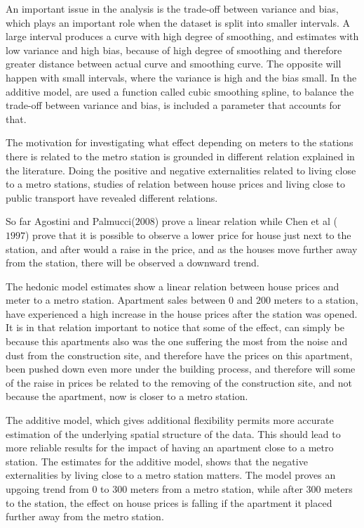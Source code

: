 An important issue in the analysis is the trade-off between variance and 
bias, which plays an important role when the dataset is split into smaller 
intervals. A large interval produces a curve with high degree of smoothing, and 
estimates with low variance and high bias, because of high degree of 
smoothing and therefore greater distance between actual curve and smoothing 
curve.  The opposite will happen with small intervals, where the variance is 
high and the bias small.  In the additive model, are used a function called 
cubic smoothing spline, to balance the trade-off between variance and 
bias, is included a parameter that accounts for that. 

The motivation for investigating what effect depending on meters to the 
stations there is related to the metro station is grounded in different 
relation explained in the literature. Doing the positive and negative 
externalities related to living close to a metro stations, studies of 
relation between house prices and living close to public transport have 
revealed different relations. 

So far Agostini and Palmucci($2008$) prove a linear relation while Chen et al (
 $1997$) prove that it is possible to observe a lower price for house just next 
to the station, and after would a raise in the price, and as the houses move 
further away from the station, there will be observed a downward trend. 

The hedonic model estimates show a linear relation between house prices and 
meter to a metro station. Apartment sales between $0$ and $200$ meters to a 
station, have experienced a high increase in the house prices after the 
station was opened. It is in that relation important to notice that some of the 
effect, can simply be because this apartments also was the one suffering the 
most from the noise and dust from the construction site, and therefore have
the prices on this apartment, been pushed down even more under the building 
process, and therefore will some of the raise in prices be related to the 
removing of the construction site, and not because the apartment, now is 
closer to a metro station.

The additive model, which gives additional flexibility permits more accurate 
estimation of the underlying spatial structure of the data. This should lead 
to more reliable results for the impact of having an apartment close to a 
metro station.
The estimates for the additive model, shows that the negative externalities by 
living close to a metro station matters. The model proves an upgoing trend from $0$
to $300$ meters from a metro station, while after $300$ meters to the station, 
the effect on house prices is falling if the apartment it placed further away 
from the metro station.   

